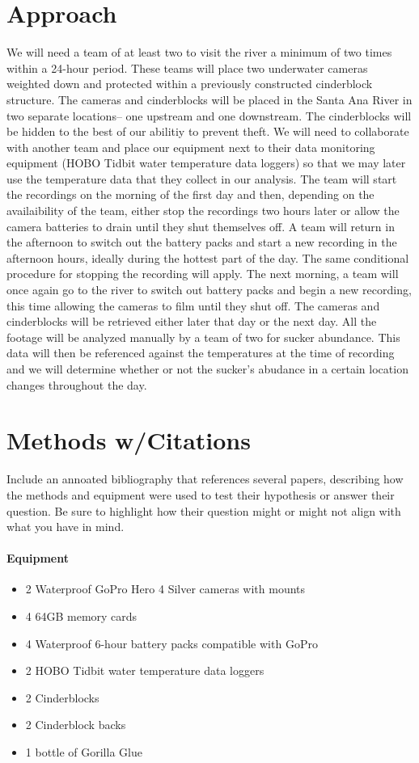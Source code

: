 \documentclass{tufte-handout}
\begin{document}
\section{Approach}
We will need a team of at least two to visit the river a minimum of two times within a 24-hour period. These teams will place two underwater cameras weighted down and protected within a previously constructed cinderblock structure. The cameras and cinderblocks will be placed in the Santa Ana River in two separate locations-- one upstream and one downstream. The cinderblocks will be hidden to the best of our abilitiy to prevent theft. We will need to collaborate with another team and place our equipment next to their data monitoring equipment (HOBO Tidbit water temperature data loggers) so that we may later use the temperature data that they collect in our analysis. 
The team will start the recordings on the morning of the first day and then, depending on the availaibility of the team, either stop the recordings two hours later or allow the camera batteries to drain until they shut themselves off. A team will return in the afternoon to switch out the battery packs and start a new recording in the afternoon hours, ideally during the hottest part of the day. The same conditional procedure for stopping the recording will apply. The next morning, a team will once again go to the river to switch out battery packs and begin a new recording, this time allowing the cameras to film until they shut off. The cameras and cinderblocks will be retrieved either later that day or the next day. All the footage will be analyzed manually by a team of two for sucker abundance. This data will then be referenced against the temperatures at the time of recording and we will determine whether or not the sucker's abudance in a certain location changes throughout the day.
 

\section{Methods w/Citations}
 Include an annoated bibliography that references several papers, describing how the methods and equipment were used to test their hypothesis or answer their question. Be sure to highlight how their question might or might not align with what you have in mind.
\paragraph{Equipment}
\begin{itemize}
\item 2 Waterproof GoPro Hero 4 Silver cameras with mounts
\item 4 64GB memory cards
\item 4 Waterproof 6-hour battery packs compatible with GoPro
\item 2 HOBO Tidbit water temperature data loggers
\item 2 Cinderblocks
\item 2 Cinderblock backs
\item 1 bottle of Gorilla Glue
\end{itemize}
\end{document}
